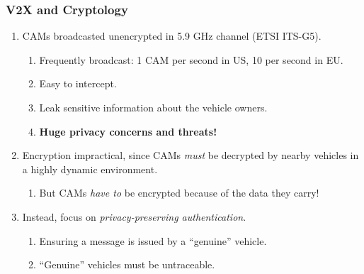 \documentclass{beamer}
\begin{document}
    \begin{frame}
        \frametitle{V2X and Cryptology}
        \begin{enumerate}
            \item CAMs broadcasted unencrypted in 5.9 GHz channel (ETSI ITS-G5).
            \begin{enumerate}
                \item Frequently broadcast: 1 CAM per second in US, 10 per
                second in EU.
                \item Easy to intercept.
                \item Leak sensitive information about the vehicle owners.
                \pause
                \item \textbf{Huge privacy concerns and threats!}
            \end{enumerate}
            \pause
            \item Encryption impractical, since CAMs \emph{must} be decrypted by
            nearby vehicles in a highly dynamic environment.
            \begin{enumerate}
                \item But CAMs \emph{have to} be encrypted because of the data
                they carry!
            \end{enumerate}
            \pause
            \item Instead, focus on \emph{privacy-preserving authentication}.
            \begin{enumerate}
                \item Ensuring a message is issued by a ``genuine'' vehicle.
                \item ``Genuine'' vehicles must be untraceable.
            \end{enumerate}
        \end{enumerate}
    \end{frame}
\end{document}
